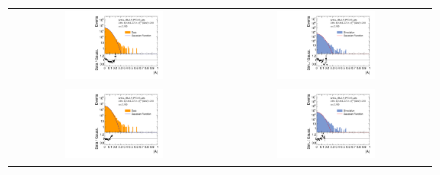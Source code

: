 \begin{figure}[!htp]   
  \centering
  \begin{tabular}{cc}
                \includegraphics[width=0.49\textwidth]{figures/AsymmHistosDataWithRatio_Eta0_pt5_alpha2_final_nominal_NoTruncation_v4c.pdf} &
                \includegraphics[width=0.49\textwidth]{figures/AsymmHistosSimWithRatio_Eta0_pt5_alpha2_final_nominal_NoTruncation_v4c.pdf} \\ 
                \includegraphics[width=0.49\textwidth]{figures/AsymmHistosDataWithRatio_Eta0_pt5_alpha2_final_nominal_v4c.pdf} &
                \includegraphics[width=0.49\textwidth]{figures/AsymmHistosSimWithRatio_Eta0_pt5_alpha2_final_nominal_v4c.pdf} \\

\end{tabular}
\end{figure}
